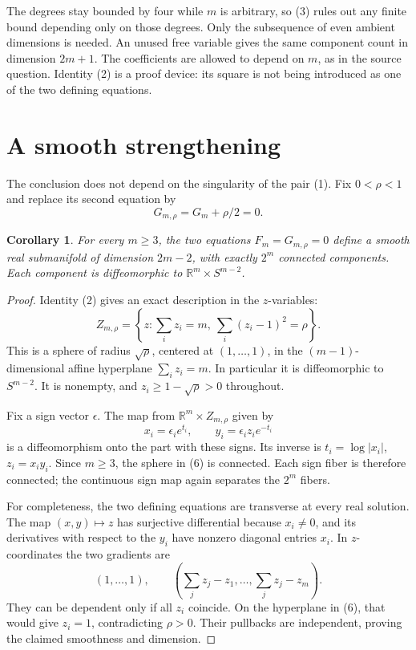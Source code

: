 \documentclass[11pt]{article}
\newtheorem{corollary}{Corollary}
\newcommand{\R}{\mathbb R}
\begin{document}
The degrees stay bounded by four while \(m\) is arbitrary, so (3)
rules out any finite bound depending only on those degrees.
Only the subsequence of even ambient dimensions is needed.
An unused free variable gives the same component count in dimension
\(2m+1\). The coefficients are allowed to depend on \(m\), as in the
source question. Identity (2) is a proof device: its square is not
being introduced as one of the two defining equations.

\section*{A smooth strengthening}
The conclusion does not depend on the singularity of the pair (1).
Fix \(0<\rho<1\) and replace its second equation by
\[
 G_{m,\rho}=G_m+\rho/2=0.                                 \tag{5}
\]
\begin{corollary}
For every \(m\geq3\), the two equations \(F_m=G_{m,\rho}=0\)
define a smooth real submanifold of dimension \(2m-2\), with
exactly \(2^m\) connected components. Each component is
diffeomorphic to \(\R^m\times S^{m-2}\).
\end{corollary}
\begin{proof}
Identity (2) gives an exact description in the \(z\)-variables:
\[
 Z_{m,\rho}
 =\left\{z:\sum_i z_i=m,\ \sum_i(z_i-1)^2=\rho\right\}.     \tag{6}
\]
This is a sphere of radius \(\sqrt\rho\), centered at
\((1,\ldots,1)\), in the \((m-1)\)-dimensional affine hyperplane
\(\sum_i z_i=m\). In particular it is diffeomorphic to \(S^{m-2}\).
It is nonempty, and \(z_i\geq1-\sqrt\rho>0\) throughout.

Fix a sign vector \(\epsilon\). The map from
\(\R^m\times Z_{m,\rho}\) given by
\[
 x_i=\epsilon_i e^{t_i},\qquad
 y_i=\epsilon_i z_i e^{-t_i}                               \tag{7}
\]
is a diffeomorphism onto the part with these signs.
Its inverse is \(t_i=\log|x_i|\), \(z_i=x_i y_i\).
Since \(m\geq3\), the sphere in (6) is connected. Each sign fiber
is therefore connected; the continuous sign map again separates
the \(2^m\) fibers.

For completeness, the two defining equations are transverse at
every real solution. The map \((x,y)\mapsto z\) has surjective
differential because \(x_i\ne0\), and its derivatives with respect
to the \(y_i\) have nonzero diagonal entries \(x_i\).
In \(z\)-coordinates the two gradients are
\[
 (1,\ldots,1),\qquad
 \left(\sum_jz_j-z_1,\ldots,\sum_jz_j-z_m\right).
\]
They can be dependent only if all \(z_i\) coincide. On the
hyperplane in (6), that would give \(z_i=1\), contradicting
\(\rho>0\). Their pullbacks are independent, proving the claimed
smoothness and dimension.
\end{proof}
\end{document}
